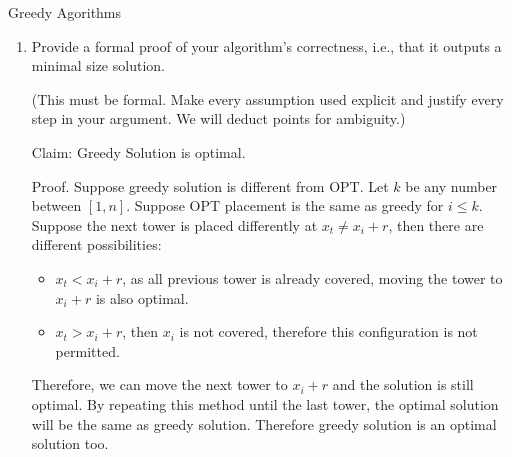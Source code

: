 \documentclass{article}
\numberwithin{table}{section}
\numberwithin{figure}{section}
\begin{document}
\begin{section}{Greedy Agorithms}
\begin{enumerate}
    \item   Provide a formal proof of your algorithm’s correctness, i.e., that it outputs a minimal size solution. 

    (This must be formal. Make every assumption used explicit and justify every step in your argument. We will deduct points for ambiguity.)
    
    \begin{tcolorbox}[parbox=false]
        Claim: Greedy Solution is optimal.
        
        Proof. Suppose greedy solution is different from OPT. 
        Let $k$ be any number between $[1, n]$. Suppose OPT placement is the same as greedy for $i \leq k$. Suppose the next tower is placed differently at $x_t \neq x_i + r$, then there are different possibilities:
        \begin{itemize}[noitemsep]
            \item $x_t < x_i + r$, as all previous tower is already covered, moving the tower to $x_i + r$ is also optimal.
            \item $x_t > x_i + r$, then $x_i$ is not covered, therefore this configuration is not permitted.
        \end{itemize}
        Therefore, we can move the next tower to $x_i + r$ and the solution is still optimal. By repeating this method until the last tower, the optimal solution will be the same as greedy solution. Therefore greedy solution is an optimal solution too.
    \end{tcolorbox}
\end{enumerate}
\end{section}
\end{document}
